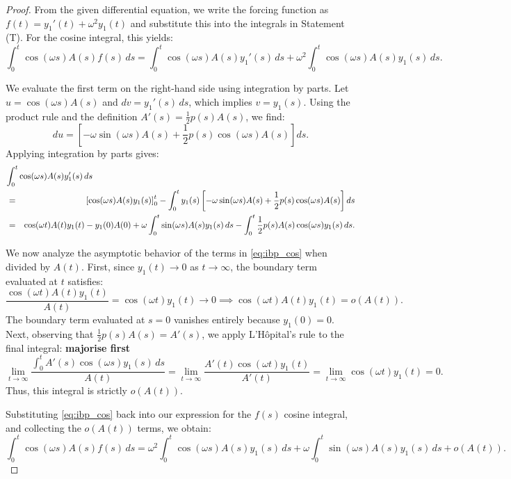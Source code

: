 \documentclass[10pt,reqno]{amsart}
\theoremstyle{definition}
\begin{document}
	\begin{proof}
		From the given differential equation, we write the forcing function as $f(t) = y_1'(t) + \omega^2 y_1(t)$ and substitute this into the integrals in Statement (T). For the cosine integral, this yields:
		\[ \int_0^t \cos(\omega s) A(s) f(s) \, ds = \int_0^t \cos(\omega s) A(s) y_1'(s) \, ds + \omega^2 \int_0^t \cos(\omega s) A(s) y_1(s) \, ds. \]
		
		We evaluate the first term on the right-hand side using integration by parts. Let $u = \cos(\omega s) A(s)$ and $dv = y_1'(s) \, ds$, which implies $v = y_1(s)$. Using the product rule and the definition $A'(s) = \frac{1}{2} p(s) A(s)$, we find:
		\[ du = \left[ -\omega \sin(\omega s) A(s) + \frac{1}{2} p(s) \cos(\omega s) A(s) \right] ds. \]
		Applying integration by parts gives:
		\begin{eqnarray} %
			\lefteqn{\int_0^t \cos(\omega s) A(s) y_1'(s) \, ds}\nonumber \\ &=& \left[ \cos(\omega s) A(s) y_1(s) \right]_0^t - \int_0^t y_1(s) \left[ -\omega \sin(\omega s) A(s) + \frac{1}{2} p(s) \cos(\omega s) A(s) \right] ds \nonumber \\
			\label{eq:ibp_cos}
			&=& \cos(\omega t) A(t) y_1(t) - y_1(0) A(0) + \omega \int_0^t \sin(\omega s) A(s) y_1(s) \, ds - \int_0^t \frac{1}{2} p(s) A(s) \cos(\omega s) y_1(s) \, ds.
		\end{eqnarray}
		
		We now analyze the asymptotic behavior of the terms in \eqref{eq:ibp_cos} when divided by $A(t)$. First, since $y_1(t) \to 0$ as $t \to \infty$, the boundary term evaluated at $t$ satisfies:
		\[ \frac{\cos(\omega t) A(t) y_1(t)}{A(t)} = \cos(\omega t) y_1(t) \to 0 \implies \cos(\omega t) A(t) y_1(t) = o(A(t)). \]
		The boundary term evaluated at $s=0$ vanishes entirely because $y_1(0) = 0$. Next, observing that $\frac{1}{2} p(s) A(s) = A'(s)$, we apply L'Hôpital's rule to the final integral: \textbf{majorise first}
		\[ \lim_{t \to \infty} \frac{\int_0^t A'(s) \cos(\omega s) y_1(s) \, ds}{A(t)} = \lim_{t \to \infty} \frac{A'(t) \cos(\omega t) y_1(t)}{A'(t)} = \lim_{t \to \infty} \cos(\omega t) y_1(t) = 0. \]
		Thus, this integral is strictly $o(A(t))$.
		
		Substituting \eqref{eq:ibp_cos} back into our expression for the $f(s)$ cosine integral, and collecting the $o(A(t))$ terms, we obtain:
		\begin{equation} \label{eq:T_cos_relation}
			\int_0^t \cos(\omega s) A(s) f(s) \, ds = \omega^2 \int_0^t \cos(\omega s) A(s) y_1(s) \, ds + \omega \int_0^t \sin(\omega s) A(s) y_1(s) \, ds + o(A(t)).
		\end{equation}
		

\end{proof}
\end{document}
